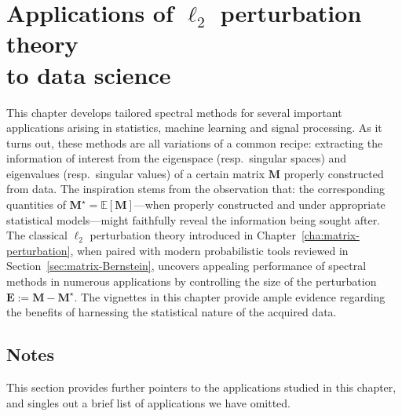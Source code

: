 \chapter[Applications of $\ell_2$ perturbation theory to data science]{Applications of $\ell_2$ perturbation theory \\ to data science}
\label{chap:application-L2}



This chapter develops tailored spectral methods for several important applications arising in statistics, machine learning and signal processing.
As it turns out,  these methods are all variations of a common recipe: extracting the information of interest  from the eigenspace (resp.~singular spaces) and eigenvalues (resp.~singular values) of a certain matrix $\bm{M}$ properly constructed from data. The inspiration stems from the observation that: the corresponding quantities of $\bm{M}^{\star}=\mathbb{E}[\bm{M}]$---when properly constructed and under appropriate statistical models---might faithfully reveal the information being sought after.
The classical $\ell_2$ perturbation theory introduced in Chapter~\ref{cha:matrix-perturbation}, when paired with modern probabilistic tools reviewed in Section~\ref{sec:matrix-Bernstein}, uncovers appealing performance of spectral methods in numerous applications by controlling the size of the perturbation $\bm{E} := \bm{M} - \bm{M}^{\star} $.
The vignettes in this chapter provide ample evidence regarding the benefits of
harnessing the statistical nature of the acquired data.















%




 \section{Notes}




This section provides further pointers to the applications studied in this chapter, and singles out a brief list of applications we have omitted.

